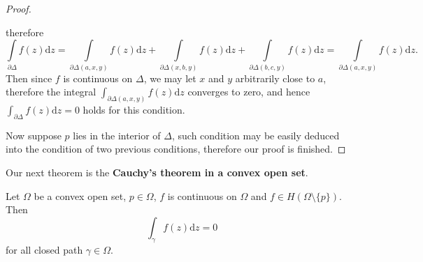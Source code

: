 \begin{proof}
\begin{center}

\end{center}
therefore 
$$
\int\limits_{\partial \Delta}{f\left( z \right) \mathrm{d}z}=\int\limits_{\partial \Delta \left( a,x,y \right)}{f\left( z \right) \mathrm{d}z}+\int\limits_{\partial \Delta \left( x,b,y \right)}{f\left( z \right) \mathrm{d}z}+\int\limits_{\partial \Delta \left( b,c,y \right)}{f\left( z \right) \mathrm{d}z}=\int\limits_{\partial \Delta \left( a,x,y \right)}{f\left( z \right) \mathrm{d}z}.
$$
Then since $f$ is continuous on $\Delta$, we may let $x$ and $y$ arbitrarily close to $a$, therefore the integral $\int_{\partial\Delta(a,x,y)}f(z)\mathrm{d}z$ converges to zero, and hence $\int_{\partial\Delta}f(z)\mathrm{d}z=0$ holds for this condition.\par
Now suppose $p$ lies in the interior of $\Delta$, such condition may be easily deduced into the condition of two previous conditions, therefore our proof is finished.
\end{proof}
Our next theorem is the \textbf{Cauchy's theorem in a convex open set}.
\begin{theorem}
Let $\Omega$ be a convex open set, $p\in\Omega$, $f$ is continuous on $\Omega$ and $f\in H(\Omega\setminus\{p\})$. Then 
$$\int_\gamma f(z)\mathrm{d}z=0$$
for all closed path $\gamma\in\Omega$.
\end{theorem}
